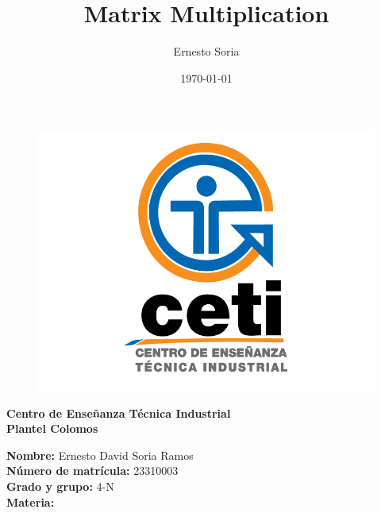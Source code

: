 \documentclass{article}
\title{\Huge \bfseries Matrix Multiplication}
\author{Ernesto Soria}
\date{\today} %
\begin{document}
	
	\maketitle %
	
	
	
	
	\begin{figure}[h] %
		\centering
		\includegraphics[width=1\textwidth]{cetilogo.png} %
		\label{fig:ceti} %
	\end{figure}
	
	\begin{center}
		{\LARGE \textbf{Centro de Enseñanza Técnica Industrial}} \\[2.5mm]
		{\LARGE \textbf{Plantel Colomos}}\\
	\end{center}
	
	\vspace{5mm} %
	
	\begin{flushleft}
		{\large \textbf{Nombre:} Ernesto David Soria Ramos} \\[2mm]
		{\large \textbf{Número de matrícula:} 23310003} \\[2mm]
		{\large \textbf{Grado y grupo:} 4-N}\\[2mm]
		{\large \textbf{Materia:} }\\[2mm]
	\end{flushleft}
	
\end{document}
